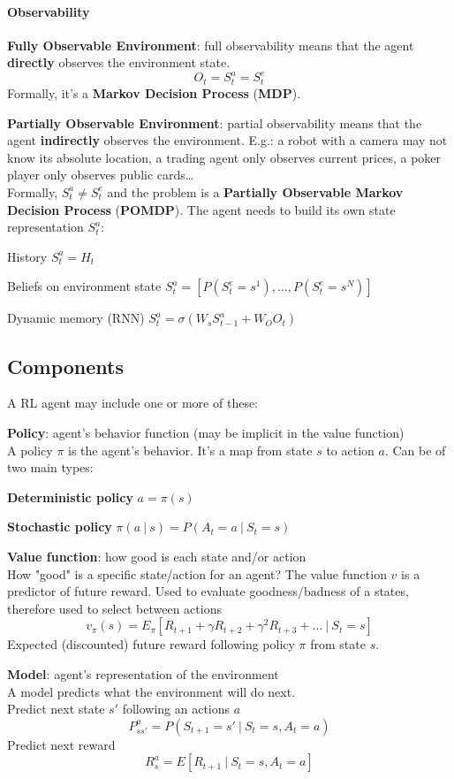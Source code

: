 \documentclass[10pt]{report}
\begin{document}
\paragraph{Observability}
\begin{list}{}{}
	\item \textbf{Fully Observable Environment}: full observability means that the agent \textbf{directly} observes the environment state.
	$$O_t = S_t^a = S_t^e$$
	Formally, it's a \textbf{Markov Decision Process} (\textbf{MDP}).
	\item \textbf{Partially Observable Environment}: partial observability means that the agent \textbf{indirectly} observes the environment. E.g.: a robot with a camera may not know its absolute location, a trading agent only observes current prices, a poker player only observes public cards\ldots\\
	Formally, $S_t^a\neq S_t^e$ and the problem is a \textbf{Partially Observable Markov Decision Process} (\textbf{POMDP}). The agent needs to build its own state representation $S_t^a$:
	\begin{list}{}{}
		\item History $S_t^a = H_t$
		\item Beliefs on environment state $S_t^a = [P(S_t^e=s^1),\ldots,P(S_t^e=s^N)]$
		\item Dynamic memory (RNN) $S_t^a = \sigma(W_sS_{t-1}^a + W_OO_t)$
	\end{list}
\end{list}
\subsection{Components}
A RL agent may include one or more of these:
\begin{list}{}{}
	\item \textbf{Policy}: agent's behavior function (may be implicit in the value function)\\
	A policy $\pi$ is the agent's behavior. It's a map from state $s$ to action $a$. Can be of two main types:
	\begin{list}{}{}
		\item \textbf{Deterministic policy} $a = \pi(s)$
		\item \textbf{Stochastic policy} $\pi(a\:|\:s) = P(A_t = a\:|\:S_t = s)$
	\end{list}
	\item \textbf{Value function}: how good is each state and/or action\\
	How "good" is a specific state/action for an agent? The value function $v$ is a predictor of future reward. Used to evaluate goodness/badness of a states, therefore used to select between actions
$$v_\pi(s)= E_\pi[R_{t+1} + \gamma R_{t+2} + \gamma^2 R_{t+3} + \ldots\:|\:S_t=s]$$
Expected (discounted) future reward following policy $\pi$ from state $s$.
	\item \textbf{Model}: agent's representation of the environment\\
	A model predicts what the environment will do next.\\
Predict next state $s'$ following an actions $a$
$$P_{ss'}^a = P(S_{t+1} = s'\:|\:S_t = s, A_t = a)$$
Predict next reward
$$R_s^a = E[R_{t+1}\:|\:S_t=s,A_t=a]$$
\end{list}
\end{document}

